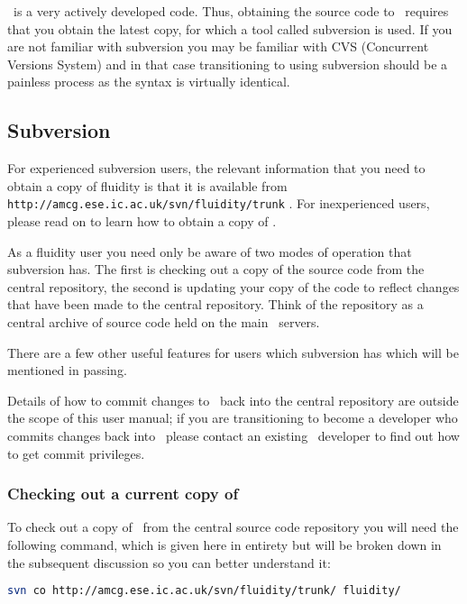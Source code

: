 \fluidity\ is a very actively developed code. Thus, obtaining the source code to
\fluidity\ requires that you obtain the latest copy, for which a tool called
subversion is used. If you are not familiar with subversion you may be
familiar with CVS (Concurrent Versions System) and in that case transitioning
to using subversion should be a painless process as the syntax is virtually
identical.

\subsection{Subversion}
\label{sect:subversion}

For experienced subversion users, the relevant information that you need to
obtain a copy of fluidity is that it is available from
\lstinline[language=Bash]+http://amcg.ese.ic.ac.uk/svn/fluidity/trunk+ .
For inexperienced users, please read on to learn how to obtain a copy of \fluidity.

As a fluidity user you need only be aware of two modes of operation that
subversion has. The first is checking out a copy of the source code from the
central repository, the second is updating your copy of the code to reflect
changes that have been made to the central repository. Think of the repository
as a central archive of source code held on the main \fluidity\ servers.

There are a few other useful features for users which subversion has which will
be mentioned in passing.

Details of how to commit changes to \fluidity\ back into the central repository
are outside the scope of this user manual; if you are transitioning to become a
developer who commits changes back into \fluidity\ please contact an existing
\fluidity\ developer to find out how to get commit privileges.

\subsubsection{Checking out a current copy of \fluidity}
\label{sect:subversion_checkout_current}

To check out a copy of \fluidity\ from the central source code repository you
will need the following command, which is given here in entirety but will be
broken down in the subsequent discussion so you can better understand it:

\begin{lstlisting}[language=Bash]
svn co http://amcg.ese.ic.ac.uk/svn/fluidity/trunk/ fluidity/
\end{lstlisting}

